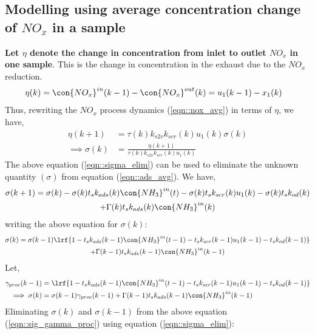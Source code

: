 \subsection{Modelling using average concentration change of $NO_x$ in a sample}
\textbf{Let $\eta$ denote the change in concentration from inlet to outlet $NO_x$ in one sample}. This is the change in concentration in the exhaust due to the $NO_x$ reduction.
%
\begin{align}
        \eta(k) &= \con{NO_x}^{in}(k-1) - \con{NO_x}^{out}(k) = u_1(k-1) - x_1(k)
\end{align}
%
Thus, rewriting the $NO_x$ process dynamics (\ref{eqn::nox_avg}) in terms of $\eta$, we have,
\begin{align}
        \eta(k+1) &= \tau(k) k_{s2v} k_{scr}(k) u_1(k) \sigma(k)\\
        \implies \sigma(k) &= \frac{\eta(k+1)}{\tau(k) k_{s2v} k_{scr}(k) u_1(k)}
        \label{eqn::sigma_elim}
\end{align}
%
The above equation (\ref{eqn::sigma_elim}) can be used to eliminate the unknown quantity $(\sigma)$ from equation (\ref{eqn::ads_avg}). We have,
\begin{multline}
        \sigma(k+1) = \sigma(k) - \sigma(k) t_s k_{ads}(k) \con{NH_3}^{in}(t)
                        - \sigma(k) t_s k_{scr}(k) u_1(k)
                        - \sigma(k) t_s k_{od}(k)
                        \\ + \Gamma(k) t_s k_{ads}(k) \con{NH_3}^{in}(k)
\end{multline}
writing the above equation for $\sigma(k)$:
\begin{multline*}
         \sigma(k) = \sigma(k-1)\lrf{1 -  t_s k_{ads}(k-1) \con{NH_3}^{in}(t-1)
                        -  t_s k_{scr}(k-1) u_1(k-1)
                        -  t_s k_{od}(k-1)}
                        \\ + \Gamma(k-1) t_s k_{ads}(k-1) \con{NH_3}^{in}(k-1)
\end{multline*}
Let,
\begin{align}
        \gamma_{proc}(k-1) &= \lrf{1 -  t_s k_{ads}(k-1) \con{NH_3}^{in}(t-1)
                        -  t_s k_{scr}(k-1) u_1(k-1)
                        -  t_s k_{od}(k-1)}
        \label{eqn::gamma_proc}
        \\
        \implies \sigma(k) &= \sigma(k-1) \gamma_{proc}(k-1) + \Gamma(k-1) t_s k_{ads}(k-1) \con{NH_3}^{in}(k-1)
        \label{eqn::sig_gamma_proc}
\end{align}
Eliminating $\sigma(k)$ and $\sigma(k-1)$ from the above equation (\ref{eqn::sig_gamma_proc}) using equation (\ref{eqn::sigma_elim}):
